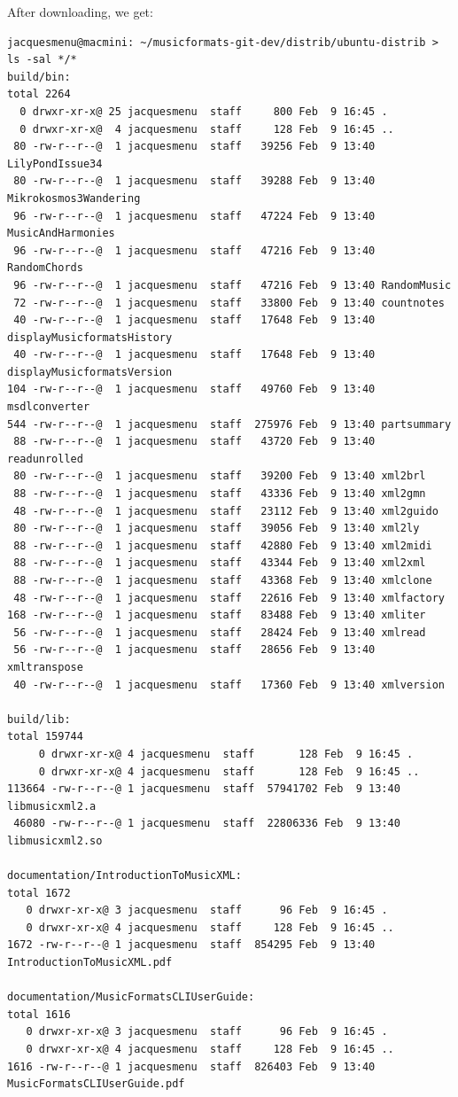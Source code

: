 After downloading, we get:
\begin{lstlisting}[language=Terminal]
jacquesmenu@macmini: ~/musicformats-git-dev/distrib/ubuntu-distrib > ls -sal */*
build/bin:
total 2264
  0 drwxr-xr-x@ 25 jacquesmenu  staff     800 Feb  9 16:45 .
  0 drwxr-xr-x@  4 jacquesmenu  staff     128 Feb  9 16:45 ..
 80 -rw-r--r--@  1 jacquesmenu  staff   39256 Feb  9 13:40 LilyPondIssue34
 80 -rw-r--r--@  1 jacquesmenu  staff   39288 Feb  9 13:40 Mikrokosmos3Wandering
 96 -rw-r--r--@  1 jacquesmenu  staff   47224 Feb  9 13:40 MusicAndHarmonies
 96 -rw-r--r--@  1 jacquesmenu  staff   47216 Feb  9 13:40 RandomChords
 96 -rw-r--r--@  1 jacquesmenu  staff   47216 Feb  9 13:40 RandomMusic
 72 -rw-r--r--@  1 jacquesmenu  staff   33800 Feb  9 13:40 countnotes
 40 -rw-r--r--@  1 jacquesmenu  staff   17648 Feb  9 13:40 displayMusicformatsHistory
 40 -rw-r--r--@  1 jacquesmenu  staff   17648 Feb  9 13:40 displayMusicformatsVersion
104 -rw-r--r--@  1 jacquesmenu  staff   49760 Feb  9 13:40 msdlconverter
544 -rw-r--r--@  1 jacquesmenu  staff  275976 Feb  9 13:40 partsummary
 88 -rw-r--r--@  1 jacquesmenu  staff   43720 Feb  9 13:40 readunrolled
 80 -rw-r--r--@  1 jacquesmenu  staff   39200 Feb  9 13:40 xml2brl
 88 -rw-r--r--@  1 jacquesmenu  staff   43336 Feb  9 13:40 xml2gmn
 48 -rw-r--r--@  1 jacquesmenu  staff   23112 Feb  9 13:40 xml2guido
 80 -rw-r--r--@  1 jacquesmenu  staff   39056 Feb  9 13:40 xml2ly
 88 -rw-r--r--@  1 jacquesmenu  staff   42880 Feb  9 13:40 xml2midi
 88 -rw-r--r--@  1 jacquesmenu  staff   43344 Feb  9 13:40 xml2xml
 88 -rw-r--r--@  1 jacquesmenu  staff   43368 Feb  9 13:40 xmlclone
 48 -rw-r--r--@  1 jacquesmenu  staff   22616 Feb  9 13:40 xmlfactory
168 -rw-r--r--@  1 jacquesmenu  staff   83488 Feb  9 13:40 xmliter
 56 -rw-r--r--@  1 jacquesmenu  staff   28424 Feb  9 13:40 xmlread
 56 -rw-r--r--@  1 jacquesmenu  staff   28656 Feb  9 13:40 xmltranspose
 40 -rw-r--r--@  1 jacquesmenu  staff   17360 Feb  9 13:40 xmlversion

build/lib:
total 159744
     0 drwxr-xr-x@ 4 jacquesmenu  staff       128 Feb  9 16:45 .
     0 drwxr-xr-x@ 4 jacquesmenu  staff       128 Feb  9 16:45 ..
113664 -rw-r--r--@ 1 jacquesmenu  staff  57941702 Feb  9 13:40 libmusicxml2.a
 46080 -rw-r--r--@ 1 jacquesmenu  staff  22806336 Feb  9 13:40 libmusicxml2.so

documentation/IntroductionToMusicXML:
total 1672
   0 drwxr-xr-x@ 3 jacquesmenu  staff      96 Feb  9 16:45 .
   0 drwxr-xr-x@ 4 jacquesmenu  staff     128 Feb  9 16:45 ..
1672 -rw-r--r--@ 1 jacquesmenu  staff  854295 Feb  9 13:40 IntroductionToMusicXML.pdf

documentation/MusicFormatsCLIUserGuide:
total 1616
   0 drwxr-xr-x@ 3 jacquesmenu  staff      96 Feb  9 16:45 .
   0 drwxr-xr-x@ 4 jacquesmenu  staff     128 Feb  9 16:45 ..
1616 -rw-r--r--@ 1 jacquesmenu  staff  826403 Feb  9 13:40 MusicFormatsCLIUserGuide.pdf
\end{lstlisting}


